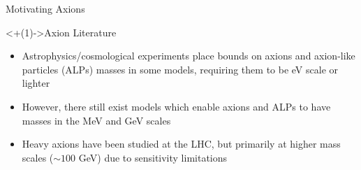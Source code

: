 \documentclass[handout]{beamer}
\begin{document}
\begin{frame}{Motivating Axions}
\begin{block}
\begin{itemize}[<+(1)->]
        \end{itemize}
    \end{block}
    \begin{block}<+(1)->{Axion Literature}
        \begin{itemize}[<+(1)->]
            \item Astrophysics/cosmological experiments place bounds on axions and axion-like particles (ALPs) masses in some models, requiring them to be eV scale or lighter
            \item However, there still exist models which enable axions and ALPs to have masses in the MeV and GeV scales
            \item Heavy axions have been studied at the LHC, but primarily at higher mass scales ($\sim 100$ GeV) due to sensitivity limitations  
        \end{itemize}
    \end{block}
\end{frame}
\end{document}
